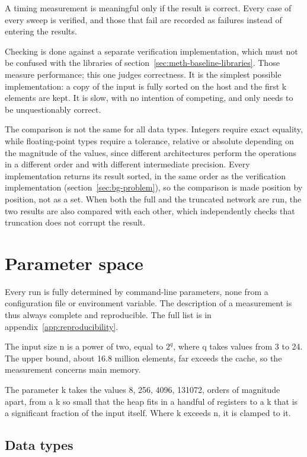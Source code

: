 A timing measurement is meaningful only if the result is correct. Every case of
every sweep is verified, and those that fail are recorded as failures instead
of entering the results.

Checking is done against a separate verification implementation, which must not
be confused with the libraries of section~\ref{sec:meth-baseline-libraries}.
Those measure performance; this one judges correctness. It is the simplest
possible implementation: a copy of the input is fully sorted on the host and
the first k elements are kept. It is slow, with no intention of competing, and
only needs to be unquestionably correct.

The comparison is not the same for all data types. Integers require exact
equality, while floating-point types require a tolerance, relative or absolute
depending on the magnitude of the values, since different architectures perform
the operations in a different order and with different intermediate precision.
Every implementation returns its result sorted, in the same order as the
verification implementation (section~\ref{sec:bg-problem}), so the comparison
is made position by position, not as a set. When both the full and the
truncated network are run, the two results are also compared with each other,
which independently checks that truncation does not corrupt the result.

\section{Parameter space}
\label{sec:meth-parameters}

Every run is fully determined by command-line parameters, none from a
configuration file or environment variable. The description of a measurement is
thus always complete and reproducible. The full list is in
appendix~\ref{app:reproducibility}.

The input size n is a power of two, equal to $2^q$, where q takes values from 3
to 24. The upper bound, about 16.8 million elements, far exceeds the cache, so
the measurement concerns main memory.

The parameter k takes the values 8, 256, 4096, 131072, orders of magnitude
apart, from a k so small that the heap fits in a handful of registers to a k
that is a significant fraction of the input itself. Where k exceeds n, it is
clamped to it.

\subsection{Data types}
\label{sec:meth-dtypes}

